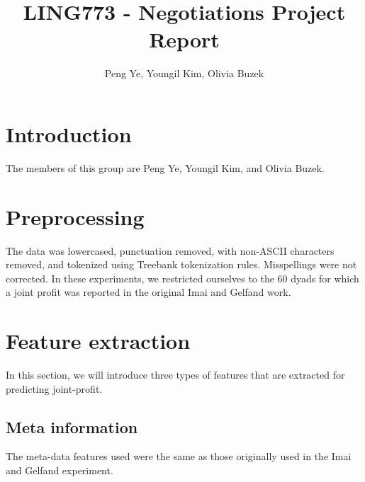 \documentclass[11pt]{article} %
\title{LING773 - Negotiations Project Report}
\author{Peng Ye, Youngil Kim, Olivia Buzek}
\begin{document}
\maketitle


\section{Introduction}

The members of this group are Peng Ye, Youngil Kim, and Olivia Buzek.

\section{Preprocessing}

The data was lowercased, punctuation removed, with non-ASCII characters removed, and tokenized using Treebank tokenization rules.  Misspellings were not corrected.  In these experiments, we restricted ourselves to the 60 dyads for which a joint profit was reported in the original Imai and Gelfand work.

\section{Feature extraction}
In this section, we will introduce three types of features that are extracted for predicting joint-profit.
\subsection{Meta information}

The meta-data features used were the same as those originally used in the Imai and Gelfand experiment.
\end{document}
